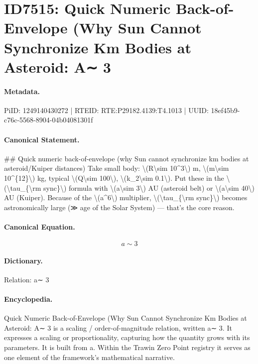 \section*{ID7515: Quick Numeric Back-of-Envelope (Why Sun Cannot Synchronize Km Bodies at Asteroid: A∼ 3}
\paragraph{Metadata.}
PiID: 1249140430272 | RTEID: RTE:P29182.4139:T4.1013 | UUID: 18ef45b9-c76c-5568-8904-04b04081301f

\paragraph{Canonical Statement.}
\#\# Quick numeric back-of-envelope (why Sun cannot synchronize km bodies at asteroid/Kuiper distances) Take small body: \textbackslash{}(R\textbackslash{}sim 10\textasciicircum{}3\textbackslash{}) m, \textbackslash{}(m\textbackslash{}sim 10\textasciicircum{}\{12\}\textbackslash{}) kg, typical \textbackslash{}(Q\textbackslash{}sim 100\textbackslash{}), \textbackslash{}(k\_2\textbackslash{}sim 0.1\textbackslash{}). Put these in the \textbackslash{}(\textbackslash{}tau\_\{\textbackslash{}rm sync\}\textbackslash{}) formula with \textbackslash{}(a\textbackslash{}sim 3\textbackslash{}) AU (asteroid belt) or \textbackslash{}(a\textbackslash{}sim 40\textbackslash{}) AU (Kuiper). Because of the \textbackslash{}(a\textasciicircum{}6\textbackslash{}) multiplier, \textbackslash{}(\textbackslash{}tau\_\{\textbackslash{}rm sync\}\textbackslash{}) becomes astronomically large (≫ age of the Solar System) — that’s the core reason.

\paragraph{Canonical Equation.}
\[
a\sim 3
\]

\paragraph{Dictionary.}
Relation: a∼ 3

\paragraph{Encyclopedia.}
Quick Numeric Back-of-Envelope (Why Sun Cannot Synchronize Km Bodies at Asteroid: A∼ 3 is a scaling / order-of-magnitude relation, written a∼ 3. It expresses a scaling or proportionality, capturing how the quantity grows with its parameters. It is built from a. Within the Trawin Zero Point registry it serves as one element of the framework's mathematical narrative.
